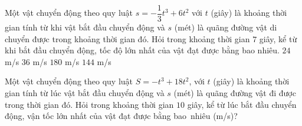 \begin{ex}%
	 Một vật chuyển động theo quy luật $s=-\dfrac{1}{3}t^3+6t^2$ với $t$ (giây) là khoảng thời gian tính từ khi vật bắt đầu chuyển động và $s$ (mét) là quãng đường vật di chuyển được trong khoảng thời gian đó. Hỏi trong khoảng thời gian $7$ giây, kể từ khi bắt đầu chuyển động, tốc độ lớn nhất của vật đạt được bằng bao nhiêu.
	\choice 
		{$24$ m/s} 
		{\True $36$ m/s} 
		{$180$ m/s} 
		{$144$ m/s} 
\end{ex}

\begin{bt}%
	Một vật chuyển động theo quy luật $S=-t^3+18t^2$, với $t$  (giây) là khoảng thời gian tính từ lúc vật bắt đầu chuyển động và $s$ (mét) là quãng đường vật đi được trong thời gian đó. Hỏi trong khoảng thời gian $10$ giây, kể từ lúc bắt đầu chuyển động, vận tốc lớn nhất của vật đạt được bằng bao~nhiêu (m/s)?
\end{bt}


